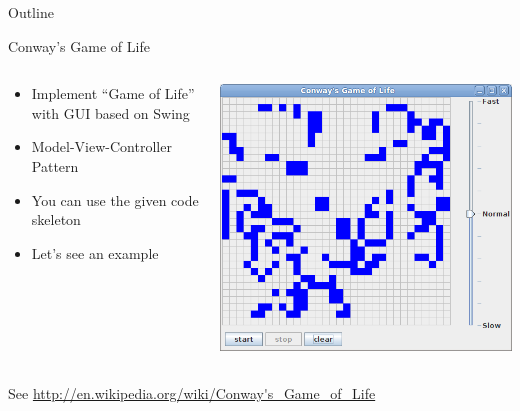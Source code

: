 \begin{frame}{Outline}
  \tableofcontents[current]
\end{frame}

\begin{frame}{Conway's Game of Life}
  \begin{columns}[c]
    \begin{column}{0.45\textwidth}
      \begin{itemize}
      \item Implement ``Game of Life'' with GUI based on Swing
      \item Model-View-Controller Pattern
      \item You can use the given code skeleton
      \item Let's see an example
      \end{itemize}
    \end{column}
    \begin{column}{0.55\textwidth}
      \begin{center}
        \includegraphics[width=\textwidth]{figures/gol}
      \end{center}
    \end{column}
  \end{columns}


  See \url{http://en.wikipedia.org/wiki/Conway's_Game_of_Life}
\end{frame}

